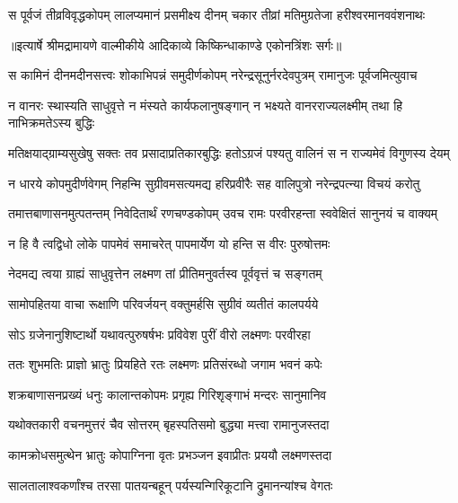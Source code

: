 \fourlineindentedshloka
{स पूर्वजं तीव्रविवृद्धकोपम्}
{लालप्यमानं प्रसमीक्ष्य दीनम्}
{चकार तीव्रां मतिमुग्रतेजा}
{हरीश्वरमानववंशनाथः} %


{॥इत्यार्षे श्रीमद्रामायणे वाल्मीकीये आदिकाव्ये किष्किन्धाकाण्डे एकोनत्रिंशः सर्गः॥}


\fourlineindentedshloka
{स कामिनं दीनमदीनसत्त्वः}
{शोकाभिपन्नं समुदीर्णकोपम्}
{नरेन्द्रसूनुर्नरदेवपुत्रम्}
{रामानुजः पूर्वजमित्युवाच} %

\fourlineindentedshloka
{न वानरः स्थास्यति साधुवृत्ते}
{न मंस्यते कार्यफलानुषङ्गान्}
{न भक्ष्यते वानरराज्यलक्ष्मीम्}
{तथा हि नाभिक्रमतेऽस्य बुद्धिः} %

\fourlineindentedshloka
{मतिक्षयाद्ग्राम्यसुखेषु सक्तः}
{तव प्रसादाप्रतिकारबुद्धिः}
{हतोऽग्रजं पश्यतु वालिनं स}
{न राज्यमेवं विगुणस्य देयम्} %

\fourlineindentedshloka
{न धारये कोपमुदीर्णवेगम्}
{निहन्मि सुग्रीवमसत्यमद्य}
{हरिप्रवीरैः सह वालिपुत्रो}
{नरेन्द्रपत्न्या विचयं करोतु} %

\fourlineindentedshloka
{तमात्तबाणासनमुत्पतन्तम्}
{निवेदितार्थं रणचण्डकोपम्}
{उवच रामः परवीरहन्ता}
{स्ववेक्षितं सानुनयं च वाक्यम्} %

\twolineshloka
{न हि वै त्वद्विधो लोके पापमेवं समाचरेत्}
{पापमार्येण यो हन्ति स वीरः पुरुषोत्तमः} %

\twolineshloka
{नेदमद्य त्वया ग्राह्यं साधुवृत्तेन लक्ष्मण}
{तां प्रीतिमनुवर्तस्व पूर्ववृत्तं च सङ्गतम्} %

\twolineshloka
{सामोपहितया वाचा रूक्षाणि परिवर्जयन्}
{वक्तुमर्हसि सुग्रीवं व्यतीतं कालपर्यये} %

\twolineshloka
{सोऽ ग्रजेनानुशिष्टार्थो यथावत्पुरुषर्षभः}
{प्रविवेश पुरीं वीरो लक्ष्मणः परवीरहा} %

\twolineshloka
{ततः शुभमतिः प्राज्ञो भ्रातुः प्रियहिते रतः}
{लक्ष्मणः प्रतिसंरब्धो जगाम भवनं कपेः} %

\twolineshloka
{शक्रबाणासनप्रख्यं धनुः कालान्तकोपमः}
{प्रगृह्य गिरिशृङ्गाभं मन्दरः सानुमानिव} %

\twolineshloka
{यथोक्तकारी वचनमुत्तरं चैव सोत्तरम्}
{बृहस्पतिसमो बुद्ध्या मत्त्वा रामानुजस्तदा} %

\twolineshloka
{कामक्रोधसमुत्थेन भ्रातुः कोपाग्निना वृतः}
{प्रभञ्जन इवाप्रीतः प्रययौ लक्ष्मणस्तदा} %

\twolineshloka
{सालतालाश्वकर्णांश्च तरसा पातयन्बहून्}
{पर्यस्यन्गिरिकूटानि द्रुमानन्यांश्च वेगतः} %

